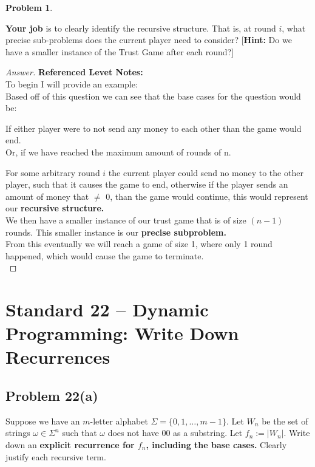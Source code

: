 \documentclass[11pt]{article}
\theoremstyle{definition}
\theoremstyle{definition}
\newtheorem{required}{Problem}
\theoremstyle{definition}
\begin{document}
\begin{required}
\begin{enumerate}
\noindent \textbf{Your job} is to clearly identify the recursive structure. That is, at round $i$, what precise sub-problems does the current player need to consider? [\textbf{Hint:} Do we have a smaller instance of the Trust Game after each round?]

\begin{proof}[Answer] \textbf{Referenced Levet Notes:} \\
To begin I will provide an example: \\

Based off of this question we can see that the base cases for the question would be: \\
\begin{center}
If either player were to not send any money to each other than the game would end. \\
Or, if we have reached the maximum amount of rounds of n.\\
\end{center}
For some arbitrary round $i$ the current player could send no money to the other player, such that it causes the game to end, otherwise if the player sends an amount of money that $\neq$ 0, than the game would continue, this would represent our \textbf{recursive structure.} \\

We then have a smaller instance of our trust game that is of size $(n-1)$ rounds. This smaller instance is our \textbf{precise subproblem.} \\

From this eventually we will reach a game of size 1, where only 1 round happened, which would cause the game to terminate. \\

\end{proof}
\end{enumerate}
\end{required}

\newpage
\section{Standard 22 -- Dynamic Programming: Write Down Recurrences}

\subsection*{Problem 22(a)}

Suppose we have an $m$-letter alphabet $\Sigma = \{0, 1, \ldots, m-1\}$. Let $W_{n}$ be the set of strings $\omega \in \Sigma^{n}$ such that $\omega$ does not have $00$ as a substring. Let $f_{n} := |W_{n}|$. Write down an \textbf{explicit recurrence for $f_{n}$, including the base cases.} Clearly justify each recursive term.
    
\end{document}
